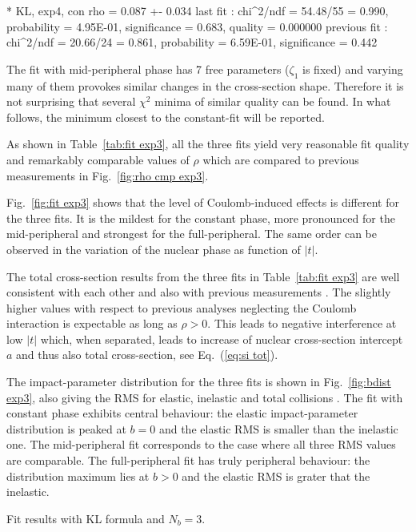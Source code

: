 * KL, exp4, con
rho    =   0.087 +-  0.034
last fit     : chi^2/ndf = 54.48/55 = 0.990, probability = 4.95E-01, significance = 0.683, quality = 0.000000
previous fit : chi^2/ndf = 20.66/24 = 0.861, probability = 6.59E-01, significance = 0.442
\fi


The fit with mid-peripheral phase has 7 free parameters ($\zeta_1$ is fixed) and varying many of them provokes similar changes in the cross-section shape. Therefore it is not surprising that several $\chi^2$ minima of similar quality can be found. In what follows, the minimum closest to the constant-fit will be reported.

As shown in Table~\ref{tab:fit exp3}, all the three fits yield very reasonable fit quality and remarkably comparable values of $\rho$ which are compared to previous measurements in Fig.~\ref{fig:rho cmp exp3}.

Fig.~\ref{fig:fit exp3} shows that the level of Coulomb-induced effects is different for the three fits. It is the mildest for the constant phase, more pronounced for the mid-peripheral and strongest for the full-peripheral. The same order can be observed in the variation of the nuclear phase as function of $|t|$.

The total cross-section results from the three fits in Table~\ref{tab:fit exp3} are well consistent with each other and also with previous measurements \cite{8tev-90m,epl101-el}. The slightly higher values with respect to previous analyses neglecting the Coulomb interaction is expectable as long as $\rho > 0$. This leads to negative interference at low $|t|$ which, when separated, leads to increase of nuclear cross-section intercept $a$ and thus also total cross-section, see Eq.~(\ref{eq:si tot}).

The impact-parameter distribution  for the three fits is shown in Fig.~\ref{fig:bdist exp3}, also giving the RMS for elastic, inelastic and total collisions . The fit with constant phase exhibits central behaviour: the elastic impact-parameter distribution is peaked at $b=0$ and the elastic RMS is smaller than the inelastic one. The mid-peripheral fit corresponds to the case where all three RMS values are comparable. The full-peripheral fit has truly peripheral behaviour: the distribution maximum lies at $b > 0$ and the elastic RMS is grater that the inelastic.


\begin{table}
\caption{Fit results with KL formula and $N_b=3$. }
\vskip-3mm
\label{tab:fit exp3}
\begin{center}
\setlength\tabcolsep{5mm}
\small

\end{center}
\end{table}

